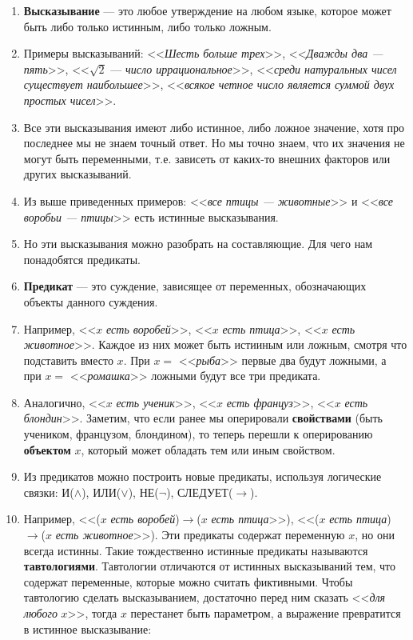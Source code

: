 \begin{enumerate}\setlength{\itemsep}{1pt}
\item \textbf{Высказывание} --- это любое утверждение на любом языке, которое может быть либо только истинным, либо только ложным.
\item Примеры высказываний: <<\textit{Шесть больше трех}>>, <<\textit{Дважды два --- пять}>>, <<$\sqrt 2$ --- \textit{число иррациональное}>>, <<\textit{среди натуральных чисел существует наибольшее}>>, <<\textit{всякое четное число является суммой двух простых чисел}>>.
\item Все эти высказывания имеют либо истинное, либо ложное значение, хотя про последнее мы не знаем точный ответ. Но мы точно знаем, что их значения не могут быть переменными, т.е. зависеть от каких-то внешних факторов или других высказываний.
\item Из выше приведенных примеров: <<\textit{все птицы --- животные}>> и <<\textit{все воробьи --- птицы}>> есть истинные высказывания.
\item Но эти высказывания можно разобрать на составляющие. Для чего нам понадобятся предикаты.
\item \textbf{Предикат} --- это суждение, зависящее от переменных, обозначающих объекты данного суждения.
\item Например, <<$x$ \textit{есть воробей}>>, <<$x$ \textit{есть птица}>>, <<$x$ \textit{есть животное}>>. Каждое из них может быть истииным или ложным, смотря что подставить вместо $x$. При $x=$ <<\textit{рыба}>> первые два будут ложными, а при $x=$ <<\textit{ромашка}>> ложными будут все три предиката.
\item Аналогично, <<$x$ \textit{есть ученик}>>, <<$x$ \textit{есть француз}>>, <<$x$ \textit{есть блондин}>>. Заметим, что если ранее мы оперировали \textbf{свойствами} (быть учеником, французом, блондином), то теперь перешли к оперированию \textbf{объектом} $x$, который может обладать тем или иным свойством.
\item Из предикатов можно построить новые предикаты, используя логические связки: И($\land$), ИЛИ($\lor$), НЕ($\neg$), СЛЕДУЕТ($\to$).
\item Например, <<($x$ \textit{есть воробей})$\to$($x$ \textit{есть птица}>>), <<($x$ \textit{есть птица})$\to$($x$ \textit{есть животное}>>). Эти предикаты содержат переменную $x$, но они всегда истинны. Такие тождественно истинные предикаты называются \textbf{тавтологиями}. Тавтологии отличаются от истинных высказываний тем, что содержат переменные, которые можно считать фиктивными. Чтобы тавтологию сделать высказыванием, достаточно перед ним сказать <<\textit{для любого} $x$>>, тогда $x$ перестанет быть параметром, а выражение превратится в истинное высказывание:


\end{enumerate}
